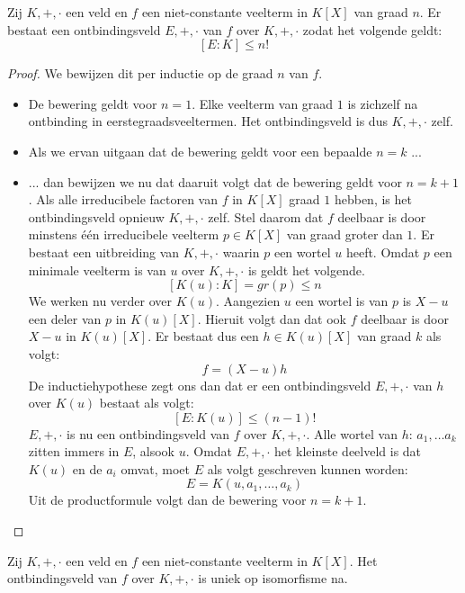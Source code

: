 \documentclass[main.tex]{subfiles}
\begin{document}
\begin{st}
  Zij $K,+,\cdot$ een veld en $f$ een niet-constante veelterm in $K[X]$ van graad $n$.
  Er bestaat een ontbindingsveld $E,+,\cdot$ van $f$ over $K,+,\cdot$ zodat het volgende geldt:
  \[ [E:K] \le n! \]

  \begin{proof}
    We bewijzen dit per inductie op de graad $n$ van $f$.
    \begin{itemize}
    \item De bewering geldt voor $n=1$.
      Elke veelterm van graad $1$ is zichzelf na ontbinding in eerstegraadsveeltermen.
      Het ontbindingsveld is dus $K,+,\cdot$ zelf.
    \item Als we ervan uitgaan dat de bewering geldt voor een bepaalde $n=k$ ...
    \item ... dan bewijzen we nu dat daaruit volgt dat de bewering geldt voor $n=k+1$.
      Als alle irreducibele factoren van $f$ in $K[X]$ graad $1$ hebben, is het ontbindingsveld opnieuw $K,+,\cdot$ zelf.
      Stel daarom dat $f$ deelbaar is door minstens \'e\'en irreducibele veelterm $p\in K[X]$ van graad groter dan $1$. 
      Er bestaat een uitbreiding van $K,+,\cdot$ waarin $p$ een wortel $u$ heeft.
      Omdat $p$ een minimale veelterm is van $u$ over $K,+,\cdot$ is geldt het volgende.
      \[ [K(u):K] = gr(p) \le n \]
      We werken nu verder over $K(u)$.
      Aangezien $u$ een wortel is van $p$ is $X-u$ een deler van $p$ in $K(u)[X]$.
      Hieruit volgt dan dat ook $f$ deelbaar is door $X-u$ in $K(u)[X]$.
      Er bestaat dus een $h\in K(u)[X]$ van graad $k$ als volgt:
      \[ f = (X-u)h \]
      De inductiehypothese zegt ons dan dat er een ontbindingsveld $E,+,\cdot$ van $h$ over $K(u)$ bestaat als volgt:
      \[ [E:K(u)] \le (n-1)! \]
      $E,+,\cdot$ is nu een ontbindingsveld van $f$ over $K,+,\cdot$.
      Alle wortel van $h$: $a_{1},\dotsc a_{k}$ zitten immers in $E$, alsook $u$.
      Omdat $E,+,\cdot$ het kleinste deelveld is dat $K(u)$ en de $a_{i}$ omvat, moet $E$ als volgt geschreven kunnen worden:
      \[ E = K(u,a_{1},\dotsc,a_{k}) \]
      Uit de productformule volgt dan de bewering voor $n=k+1$.      
    \end{itemize}
  \end{proof}
\end{st}

\begin{st}
  Zij $K,+,\cdot$ een veld en $f$ een niet-constante veelterm in $K[X]$.
  Het ontbindingsveld van $f$ over $K,+,\cdot$ is uniek op isomorfisme na.
  \zb
\end{st}
\end{document}
